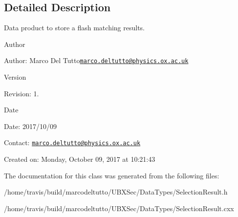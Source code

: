 \subsection{Detailed Description}
Data product to store a flash matching results. 

\begin{DoxyAuthor}{Author}

\end{DoxyAuthor}
\begin{DoxyParagraph}{Author\-:}
Marco Del Tutto\href{mailto:marco.deltutto@physics.ox.ac.uk}{\tt marco.\-deltutto@physics.\-ox.\-ac.\-uk} 
\end{DoxyParagraph}


\begin{DoxyVersion}{Version}

\end{DoxyVersion}
\begin{DoxyParagraph}{Revision\-:}
1. 
\end{DoxyParagraph}


\begin{DoxyDate}{Date}

\end{DoxyDate}
\begin{DoxyParagraph}{Date\-:}
2017/10/09 
\end{DoxyParagraph}


Contact\-: \href{mailto:marco.deltutto@physics.ox.ac.uk}{\tt marco.\-deltutto@physics.\-ox.\-ac.\-uk}

Created on\-: Monday, October 09, 2017 at 10\-:21\-:43 

The documentation for this class was generated from the following files\-:\begin{DoxyCompactItemize}
\item 
/home/travis/build/marcodeltutto/\-U\-B\-X\-Sec/\-Data\-Types/Selection\-Result.\-h\item 
/home/travis/build/marcodeltutto/\-U\-B\-X\-Sec/\-Data\-Types/Selection\-Result.\-cxx\end{DoxyCompactItemize}
